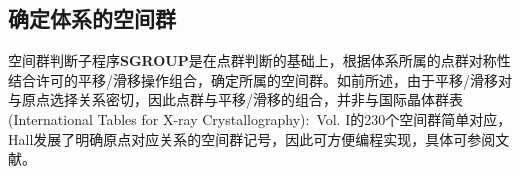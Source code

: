 \subsection{确定体系的空间群}
空间群判断子程序\textbf{SGROUP}是在点群判断的基础上，根据体系所属的点群对称性结合许可的平移/滑移操作组合，确定所属的空间群。如前所述，由于平移/滑移对与原点选择关系密切，因此点群与平移/滑移的组合，并非与国际晶体群表\textrm{(International Tables for X-ray Crystallography):~Vol. I}的230个空间群简单对应，\textrm{Hall}发展了明确原点对应关系的空间群记号，因此可方便编程实现，具体可参阅文献\cite{ACA37-517_1981,ACA55-383_1999,ACA58-60_2002}。
